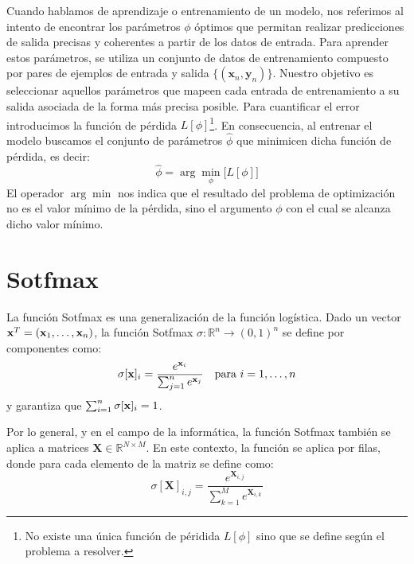 Cuando hablamos de aprendizaje o entrenamiento de un modelo, nos referimos al intento 
de encontrar los parámetros $\phi$ óptimos que permitan realizar predicciones de salida 
precisas y coherentes a partir de los datos de entrada. 
Para aprender estos parámetros, se utiliza un 
conjunto de datos de entrenamiento compuesto por pares de 
ejemplos de entrada y salida $ \{(\mathbf{x}_n, \mathbf{y}_n)\}$. 
Nuestro objetivo es seleccionar aquellos parámetros que mapeen cada entrada de 
entrenamiento a su salida asociada de la forma más precisa posible. 
Para cuantificar el error introducimos la función de pérdida 
$L[\phi]$\footnote{No existe una única función de péridida $L[\phi]$ sino que se define 
según el problema a resolver.}. 
En consecuencia, al entrenar el modelo buscamos el conjunto de parámetros 
$\hat{\phi}$ que minimicen dicha función de pérdida, es decir:
\begin{equation}
    \hat{\phi} = \arg\min_{\phi} \Big[ L[\phi] \Big]
\end{equation}
El operador $\arg \min$ nos indica que el resultado del problema de 
optimización no es el valor mínimo de la pérdida, sino el argumento $\phi$ 
con el cual se alcanza dicho valor mínimo. 



\section{Sotfmax}

La función Sotfmax es una generalización de la función logística.
Dado un vector $\mathbf{x}^T = (\mathbf{x}_1, \dots, \mathbf{x}_n)$, la función Sotfmax $\sigma: \mathbb{R}^n \to (0,1)^n$ se define por componentes como:
\begin{equation}
    \sigma[\mathbf{x}]_i = \frac{e^{\mathbf{x}_i}}{\sum_{j=1}^{n} e^{\mathbf{x}_j}} \quad \text{para } i = 1, \dots, n
\end{equation}
y garantiza que  $\sum_{i=1}^n \sigma[\mathbf{x}]_i = 1$.

Por lo general, y en el campo de la informática, la función Sotfmax también se aplica a matrices $\mathbf{X}  \in \mathbb{R}^{N\times M}$. 
En este contexto, la función se aplica por filas, donde para cada elemento de la matriz se define como:
\begin{equation}
    \sigma[\mathbf{X}]_{i,j} = \frac{e^{\mathbf{X}_{i,j}}}{\sum_{k=1}^{M} e^{\mathbf{X}_{i,k}}}
\end{equation}


